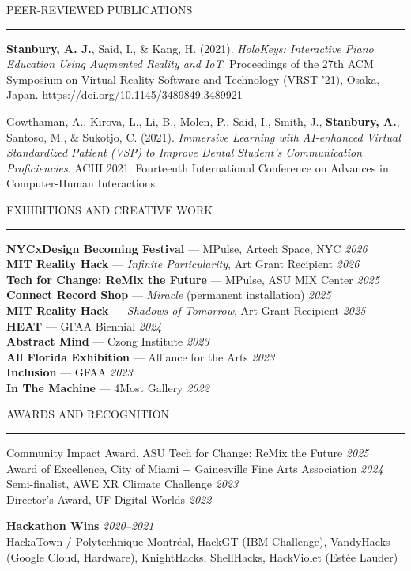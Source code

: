 \documentclass{resume} %
\renewenvironment{rSection}[1]{
  \needspace{4\baselineskip}
  \sectionskip
  \textcolor{CustomRed}{\MakeUppercase{#1}}
  \sectionlineskip
  \hrule
  \begin{list}{}{
    \setlength{\leftmargin}{1.5em}
  }
  \item[]
}{
  \end{list}
}
\begin{document}
\begin{rSection}{Peer-Reviewed Publications}
\textbf{Stanbury, A. J.}, Said, I., \& Kang, H. (2021). \textit{HoloKeys: Interactive Piano Education Using Augmented Reality and IoT}. Proceedings of the 27th ACM Symposium on Virtual Reality Software and Technology (VRST '21), Osaka, Japan. \url{https://doi.org/10.1145/3489849.3489921}

Gowthaman, A., Kirova, L., Li, B., Molen, P., Said, I., Smith, J., \textbf{Stanbury, A.}, Santoso, M., \& Sukotjo, C. (2021). \textit{Immersive Learning with AI-enhanced Virtual Standardized Patient (VSP) to Improve Dental Student's Communication Proficiencies}. ACHI 2021: Fourteenth International Conference on Advances in Computer-Human Interactions.
\end{rSection}

\begin{rSection}{Exhibitions and Creative Work}
\textbf{NYCxDesign Becoming Festival} --- MPulse, Artech Space, NYC \hfill \emph{2026}\\
\textbf{MIT Reality Hack} --- \textit{Infinite Particularity}, Art Grant Recipient \hfill \emph{2026}\\
\textbf{Tech for Change: ReMix the Future} --- MPulse, ASU MIX Center \hfill \emph{2025}\\
\textbf{Connect Record Shop} --- \textit{Miracle} (permanent installation) \hfill \emph{2025}\\
\textbf{MIT Reality Hack} --- \textit{Shadows of Tomorrow}, Art Grant Recipient \hfill \emph{2025}\\
\textbf{HEAT} --- GFAA Biennial \hfill \emph{2024}\\
\textbf{Abstract Mind} --- Czong Institute \hfill \emph{2023}\\
\textbf{All Florida Exhibition} --- Alliance for the Arts \hfill \emph{2023}\\
\textbf{Inclusion} --- GFAA \hfill \emph{2023}\\
\textbf{In The Machine} --- 4Most Gallery \hfill \emph{2022}
\end{rSection}

\begin{rSection}{Awards and Recognition}
Community Impact Award, ASU Tech for Change: ReMix the Future \hfill \emph{2025}\\
Award of Excellence, City of Miami + Gainesville Fine Arts Association \hfill \emph{2024}\\
Semi-finalist, AWE XR Climate Challenge \hfill \emph{2023}\\
Director's Award, UF Digital Worlds \hfill \emph{2022}

\vspace{0.4em}
\textbf{Hackathon Wins} \hfill \emph{2020--2021}\\
HackaTown / Polytechnique Montr\'eal, HackGT (IBM Challenge), VandyHacks (Google Cloud, Hardware), KnightHacks, ShellHacks, HackViolet (Est\'ee Lauder)
\end{rSection}
\end{document}
